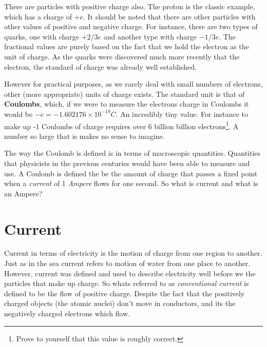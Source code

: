 \documentclass[12pt]{article}
\begin{document}
There are particles with positive charge also. The proton is the classic example, which has a charge of $+e$. It should be noted that there are other particles with other values of positive and negative charge. For instance, there are two types of quarks, one with charge $+2/3e$ and another type with charge $-1/3 e$. The fractional values are purely based on the fact that we hold the electron as the unit of charge. As the quarks were discovered much more recently that the electron, the standard of charge was already well established.

However for practical purposes, as we rarely deal with small numbers of electrons, other (more appropriate) units of charge exists. 
The standard unit is that of \textbf{Coulombs}, which, if we were to measure the electrons charge in Coulombs it would be \(-e = -1.602176 \times 10^{-19}C\). An incredibly tiny value. 
For instance to make up -1 Coulombs of charge requires over 6 billion billion electrons\footnote{Prove to yourself that this value is roughly correct.}. A number so large that is makes no sense to imagine.  

The way the Coulomb is defined is in terms of macroscopic quantities.
Quantities that physicists in the previous centuries would have been able to measure and use.
A Coulomb is defined the be the amount of charge that passes a fixed point when a \emph{current} of 1 \emph{Ampere} flows for one second.
So what is current and what is an Ampere?

\section{Current}\label{current}

Current in terms of electricity is the motion of charge from one region to another. Just as in the sea current refers to motion of water from one place to another. 
However, current was defined and used to describe electricity well before we the particles that make up charge. 
So whats referred to as \emph{conventional current} is defined to be the flow of positive charge. 
Despite the fact that the positively charged objects (the atomic nuclei) don't move in conductors, and its the negatively charged electrons which flow.
\end{document}
